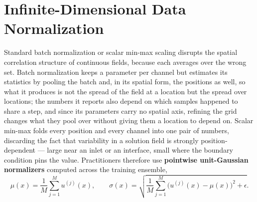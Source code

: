 \section{Infinite-Dimensional Data Normalization}
\label{sec:ch21-normalization}

Standard batch normalization or scalar min-max scaling disrupts the spatial correlation
structure of continuous fields, because each averages over the wrong set. Batch
normalization keeps a parameter per channel but estimates its statistics by pooling the
batch and, in its spatial form, the positions as well, so what it produces is not the
spread of the field at a location but the spread over locations; the numbers it reports
also depend on which samples happened to share a step, and since its parameters carry no
spatial axis, refining the grid changes what they pool over without giving them a location
to depend on. Scalar min-max folds every position
and every channel into one pair of numbers, discarding the fact that variability in a
solution field is strongly position-dependent --- large near an inlet or an interface,
small where the boundary condition pins the value. Practitioners therefore use
\textbf{pointwise unit-Gaussian normalizers} computed across the training ensemble,
\begin{equation}
  \label{eq:ch21-normalize}
  \mu(x) = \frac{1}{M} \sum_{j=1}^M u^{(j)}(x), \qquad \sigma(x) = \sqrt{\frac{1}{M} \sum_{j=1}^M \big(u^{(j)}(x) - \mu(x)\big)^2 + \epsilon}.
\end{equation}

